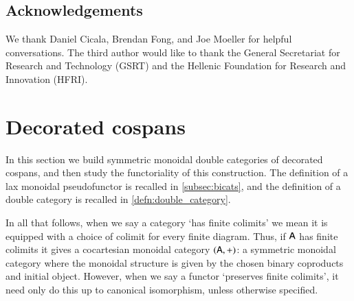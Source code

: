 \documentclass[reqno]{amsart}
\begin{document}
\subsection*{Acknowledgements}

We thank Daniel Cicala, Brendan Fong, and Joe Moeller for helpful conversations. The third author would  like  to  thank  the  General  Secretariat  for  Research  and Technology (GSRT) and the Hellenic Foundation for Research and Innovation (HFRI).

\section{Decorated cospans}\label{DecCospansDoubleCat}

In this section we build symmetric monoidal double categories of decorated cospans, and then study the functoriality of this construction. The definition of a lax monoidal pseudofunctor is recalled in \cref{subsec:bicats}, and the definition of a double category is recalled in \cref{defn:double_category}.  

In all that follows, when we say a category `has finite colimits' we mean it is equipped with a choice of colimit for every finite diagram.   Thus, if $\mathsf{A}$ has finite colimits it gives a cocartesian monoidal category $(\mathsf{A},+)$: a symmetric monoidal category where the monoidal structure is given by the chosen binary coproducts and initial object.   However, when we say a functor `preserves finite colimits', it need only do this up to canonical isomorphism, unless otherwise specified.
\end{document}
